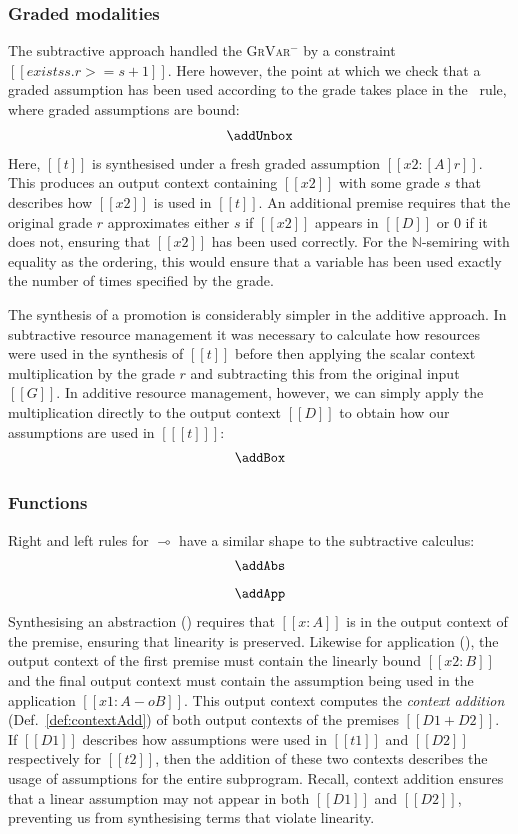 \subsubsection{Graded modalities}
The subtractive approach handled the \textsc{GrVar$^{-}$}
by a constraint $[[ exists s . r >= s + 1]]$. Here however, the
point at which we check that a graded assumption has been used
according to the grade takes place in the \addUnboxName\ rule, where graded
assumptions are bound:
%
\begin{align*}
  \addUnbox
  \end{align*}
%
Here, $[[t]]$ is synthesised under a fresh graded assumption
$[[ x2 : [A] r]]$. This produces an output context containing $[[x2]]$ with
some grade $s$ that describes how $[[x2]]$ is used in $[[t]]$. An
additional premise requires that the original grade $r$ approximates either $s$
if $[[x2]]$ appears in $[[D]]$ or $0$ if it does not,
ensuring that $[[x2]]$ has been used correctly. For the
$\mathbb{N}$-semiring with equality as the ordering, this would
ensure that a variable has been used exactly the number of times
specified by the grade.

The synthesis of a promotion is considerably simpler in the additive
approach. In subtractive resource management it was necessary to calculate how
resources were used in the synthesis of $[[t]]$ before then applying the
scalar context multiplication by the grade $r$ and subtracting this from the
original input $[[G]]$. In additive resource management, however, we can simply
apply the multiplication directly to the output context $[[D]]$ to obtain how
our assumptions are used in $[[ [t] ]]$:
%
\begin{align*}
  \addBox
\end{align*}

\subsubsection{Functions}
Right and left rules for $\multimap$ have a similar shape to the
subtractive calculus:
%
\begin{align*}
\begin{array}{c}
\addAbs
\\[0.8em]
\addApp
\end{array}
\end{align*}
%
Synthesising an abstraction (\addAbsName) requires that $[[x : A]]$ is in
the output context of the premise, ensuring that linearity is preserved.
Likewise for application (\addAppName), the output
context of the first premise must contain the linearly bound $[[x2 :
B]]$ and the final output context must contain the assumption being used in the
application $[[ x1 : A -o B ]]$. This output context computes the \emph{context
addition} (Def.~\ref{def:contextAdd}) of both output contexts of the premises $[[D1 + D2]]$. If $[[D1]]$
describes how assumptions were used in $[[t1]]$ and $[[D2]]$ respectively for
$[[t2]]$, then the addition of these two contexts describes the usage of
assumptions for the entire subprogram. Recall, context addition
ensures that a linear assumption may not appear in both $[[D1]]$ and
$[[D2]]$, preventing us from synthesising terms that violate linearity.



